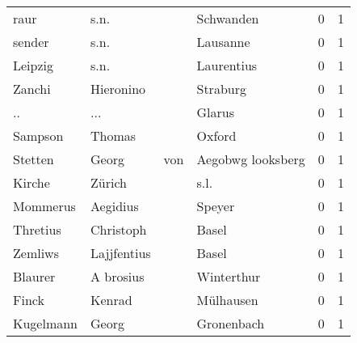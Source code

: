 \begin{tabular}{llllrr}
                     raur &                               s.n. &             &                                   Schwanden &          0 &         1 \\
                   sender &                               s.n. &             &                                    Lausanne &          0 &         1 \\
                  Leipzig &                               s.n. &             &                                  Laurentius &          0 &         1 \\
                   Zanchi &                          Hieronino &             &                                    Straburg &          0 &         1 \\
                       .. &                                ... &             &                                      Glarus &          0 &         1 \\
                  Sampson &                             Thomas &             &                                      Oxford &          0 &         1 \\
                  Stetten &                              Georg &         von &                           Aegobwg looksberg &          0 &         1 \\
                   Kirche &                             Zürich &             &                                        s.l. &          0 &         1 \\
                 Mommerus &                           Aegidius &             &                                      Speyer &          0 &         1 \\
                 Thretius &                          Christoph &             &                                       Basel &          0 &         1 \\
                  Zemliws &                        Lajjfentius &             &                                       Basel &          0 &         1 \\
                  Blaurer &                          A brosius &             &                                  Winterthur &          0 &         1 \\
                    Finck &                             Kenrad &             &                                   Mülhausen &          0 &         1 \\
                Kugelmann &                              Georg &             &                                  Gronenbach &          0 &         1 \\

\end{tabular}
